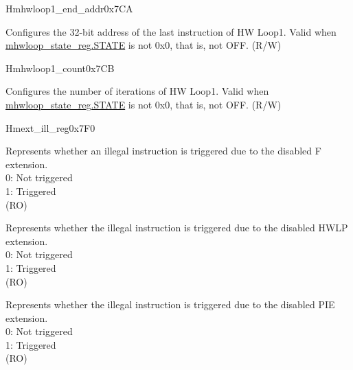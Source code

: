 \begin{register}{H}{mhwloop1\_end\_addr}{0x7CA}\label{regdesc:mhloop1_end_addr}
%
\regnewline%
\begin{regdesc}\begin{reglist}
\label{fielddesc:HWLP1_EA}\item [EA] Configures the 32-bit address of the last instruction of HW Loop1. Valid when \hyperref[fielddesc:HWSTATE]{mhwloop\_state\_reg.STATE} is not 0x0, that is, not OFF. (R/W)
\end{reglist}\end{regdesc}
\end{register}

\begin{register}{H}{mhwloop1\_count}{0x7CB}\label{regdesc:mhloop1_count}
%
%
\regnewline%
\begin{regdesc}\begin{reglist}
\label{fielddesc:MHLP1_COUNT}\item [COUNT] Configures the number of iterations of HW Loop1. Valid when \hyperref[fielddesc:HWSTATE]{mhwloop\_state\_reg.STATE} is not 0x0, that is, not OFF. (R/W)
\end{reglist}\end{regdesc}
\end{register}

\begin{register}{H}{mext\_ill\_reg}{0x7F0}\label{regdesc:mext_ill_reg}
%
%
%
%
\regnewline%
\begin{regdesc}\begin{reglist}
\label{fielddesc:ILL_FPU}\item [ILL\_FPU] Represents whether an illegal instruction is triggered due to the disabled F extension.\\
0: Not triggered\\
1: Triggered\\
(RO)
\label{fielddesc:ILL_HWL}\item [ILL\_HWL] Represents whether the illegal instruction is triggered due to the disabled HWLP extension. \\
0: Not triggered\\
1: Triggered\\
(RO)
\label{fielddesc:ILL_PIE}\item [ILL\_PIE] Represents whether the illegal instruction is triggered due to the disabled PIE extension. \\
0: Not triggered\\
1: Triggered\\
(RO)
\end{reglist}\end{regdesc}
\end{register}

